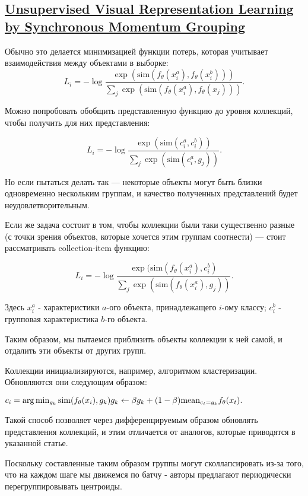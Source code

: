 \documentclass{article}
\begin{document}
\subsection{\href{https://arxiv.org/pdf/2207.06167v1.pdf}{Unsupervised Visual Representation Learning
by Synchronous Momentum Grouping}}

Обычно это делается минимизацией функции потерь, которая учитывает взаимодействия между объектами в выборке:
$$
L_i = - \log \frac{\exp(\mathrm{sim}(f_\theta(x_i^a), f_\theta(x_i^b)))}{\sum_j \exp(\mathrm{sim}(f_\theta(x_i^a), f_\theta(x_j)))}.
$$

Можно попробовать обобщить представленную функцию до уровня коллекций, чтобы получить для них представления:

$$
L_i = - \log \frac{\exp(\mathrm{sim}(c_i^a, c_i^b))}{\sum_j \exp(\mathrm{sim}(c_i^a, g_j))}.
$$

Но если пытаться делать так --- некоторые объекты могут быть близки одновременно нескольким группам, и качество полученных представлений будет неудовлетворительным.

Если же задача состоит в том, чтобы коллекции были таки существенно разные (с точки зрения объектов, которые хочется этим группам соотнести) --- стоит рассматривать collection-item функцию:

$$
L_i = - \log \frac{\exp(\mathrm{sim}(f_\theta(x_i^a), c_i^b)}{\sum_j \exp(\mathrm{sim}(f_\theta(x_i^a), g_j))}.
$$

Здесь $x_i^a$ - характеристики $a$-ого объекта, принадлежащего $i$-ому классу; $c_i^b$ - групповая характеристика $b$-го объекта.

Таким образом, мы пытаемся приблизить объекты коллекции к ней самой, и отдалить эти объекты от других групп.

Коллекции инициализируются, например, алгоритмом кластеризации. Обновляются они следующим образом:

\begin{center}
$
c_i = \arg \min_{g_k}\mathrm{sim}(f_{\theta}(x_i), g_k) \\
g_k \leftarrow \beta g_k + (1 - \beta) \mathrm{mean}_{c_t = g_k} f_{\theta}(x_t).
$
\end{center}

Такой способ позволяет через дифференцируемым образом обновлять представления коллекций, и этим отличается от аналогов, которые приводятся в указанной статье.

Поскольку составленные таким образом группы могут сколлапсировать из-за того, что на каждом шаге мы движемся по батчу - авторы предлагают периодически перегруппировывать центроиды.
\end{document}

